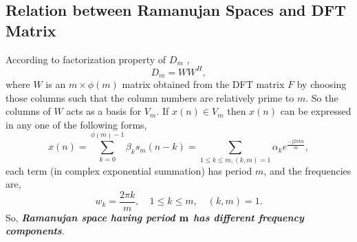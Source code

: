 \documentclass[conference]{IEEEtran}
\begin{document}
\subsection{Relation between Ramanujan Spaces and DFT Matrix}
According to factorization property of $D_m$  \cite{6839014},
\begin{equation}
\label{eq:DM}
D_m=W W^H,
\end{equation}
where $W$ is an $m\times \phi(m)$ matrix obtained from the DFT matrix $F$ by choosing those columns such that the column numbers are relatively prime to $m.$ So the columns of $W$ acts as a basis for $V_m.$
If $x(n){\in}V_m$ then $x(n)$ can be expressed in any one of the following forms,
\begin{equation}
x(n) = \sum_{k=0}^{\phi{(m)}-1}{\beta}_{k}s_m(n-k) = \sum_{1{\leq}k{\leq}m,(k,m)=1} {\alpha_k}{e^\frac{-j2{\pi}kn}{m}},
\end{equation}
each term (in complex exponential summation) has period $m$, and the frequencies are,
\begin{equation}
\label{eq10}
w_k = \frac{2{\pi}k}{m},{\quad}{1{\leq}k{\leq}m},\quad {(k,m)=1}.
\end{equation}
So, \textit{\bfseries{Ramanujan space having period $\bold{m}$ has different frequency components}}.
\end{document}
